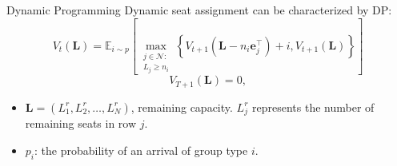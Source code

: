   \begin{frame}{Dynamic Programming}
    \centering
    Dynamic seat assignment can be characterized by DP:
    $$V_{t}(\mathbf{L}) = \mathbb{E}_{i \sim p}\left[\max_{\substack{j \in \mathcal{N}: \\ L_j \geqslant {n}_{i}}}\left\{V_{t+1}\left(\mathbf{L}- n_{i}\mathbf{e}_j^{\intercal} \right)+ i, V_{t+1}(\mathbf{L})\right\}\right]$$
    $$V_{T+1}(\mathbf{L}) = 0,$$

    \begin{itemize}
      \item $\mathbf{L} = (L^{r}_1, L^{r}_2, \ldots, L^{r}_{N})$, remaining capacity. $L^{r}_{j}$ represents the number of remaining seats in row $j$.
      \vspace{10pt}
      \item $p_i$: the probability of an arrival of group type $i$.
    \end{itemize}
\end{frame}